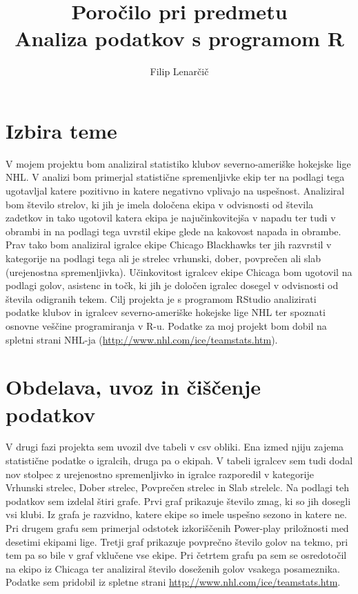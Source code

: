 \documentclass[11pt,a4paper]{article}
\begin{document}
\title{Poročilo pri predmetu \\
Analiza podatkov s programom R}
\author{Filip Lenarčič}
\maketitle

\section{Izbira teme}

V mojem projektu bom analiziral statistiko klubov severno-ameriške hokejske lige NHL.  V analizi bom primerjal statistične spremenljivke ekip ter na podlagi tega ugotavljal katere pozitivno in katere negativno vplivajo na uspešnost. Analiziral bom število strelov, ki jih je imela določena ekipa v odvisnosti od števila zadetkov in tako ugotovil katera ekipa je najučinkovitejša v napadu ter tudi v obrambi in na podlagi tega uvrstil ekipe glede na kakovost napada in obrambe. Prav tako bom analiziral igralce ekipe Chicago Blackhawks ter jih razvrstil v kategorije na podlagi tega ali je strelec vrhunski, dober, povprečen ali slab (urejenostna spremenljivka).  Učinkovitost igralcev ekipe Chicaga bom ugotovil na podlagi golov, asistenc in točk, ki jih je določen igralec dosegel v odvisnosti od števila odigranih tekem.
Cilj projekta je s programom RStudio analizirati podatke klubov in igralcev severno-ameriške hokejske lige NHL ter spoznati osnovne veščine programiranja v R-u. Podatke za moj projekt bom dobil na spletni strani NHL-ja (\url{http://www.nhl.com/ice/teamstats.htm}).


\section{Obdelava, uvoz in čiščenje podatkov}

V drugi fazi projekta sem uvozil dve tabeli v csv obliki. Ena izmed njiju zajema statistične podatke o igralcih, druga pa o ekipah. V tabeli igralcev sem tudi dodal nov stolpec z urejenostno spremenljivko in igralce razporedil v kategorije Vrhunski strelec, Dober strelec, Povprečen strelec in Slab strelelc. Na podlagi teh podatkov sem izdelal štiri grafe. Prvi graf prikazuje število zmag, ki so jih dosegli vsi klubi. Iz grafa je razvidno, katere ekipe so imele uspešno sezono in katere ne. Pri drugem grafu sem primerjal odstotek izkoriščenih Power-play priložnosti med desetimi ekipami lige. Tretji graf prikazuje povprečno število golov na tekmo, pri tem pa so bile v graf vklučene vse ekipe. Pri četrtem grafu pa sem se osredotočil na ekipo iz Chicaga ter analiziral število doseženih golov vsakega posameznika. Podatke sem pridobil iz spletne strani \url{http://www.nhl.com/ice/teamstats.htm}. 
\end{document}
